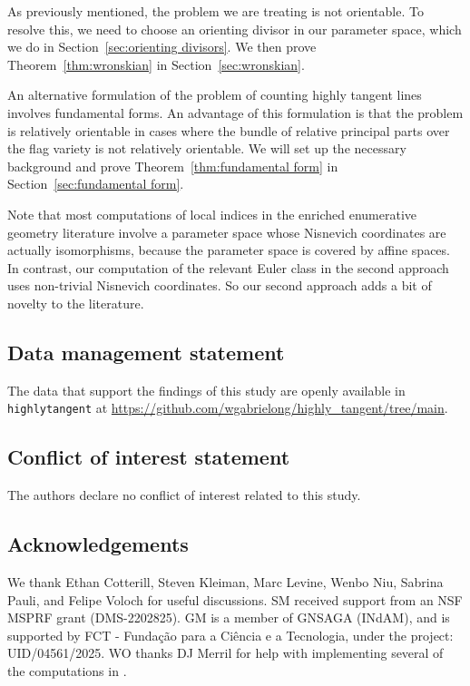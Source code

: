 \documentclass[12pt]{amsart}
\numberwithin{equation}{section}
\theoremstyle{plain}
\theoremstyle{definition}
\begin{document}
As previously mentioned, the problem we are treating is not orientable. To resolve this, we need to choose an orienting divisor in our parameter space, which we do in Section~\ref{sec:orienting divisors}. We then prove Theorem~\ref{thm:wronskian} in Section~\ref{sec:wronskian}.

An alternative formulation of the problem of counting highly tangent lines involves fundamental forms. An advantage of this formulation is that the problem is relatively orientable in cases where the bundle of relative principal parts over the flag variety is not relatively orientable. We will set up the necessary background and prove Theorem~\ref{thm:fundamental form} in Section~\ref{sec:fundamental form}.

Note that most computations of local indices in the enriched enumerative geometry literature involve a parameter space whose Nisnevich coordinates are actually isomorphisms, because the parameter space is covered by affine spaces. In contrast, our computation of the relevant Euler class in the second approach uses non-trivial Nisnevich coordinates. So our second approach adds a bit of novelty to the literature.

\subsection*{Data management statement}
The data that support the findings of this study are openly available in \texttt{highly\textunderscore{}tangent} at \url{https://github.com/wgabrielong/highly_tangent/tree/main}.

\subsection*{Conflict of interest statement}
The authors declare no conflict of interest related to this study.

\subsection*{Acknowledgements}
We thank Ethan Cotterill, Steven Kleiman, Marc Levine, Wenbo Niu, Sabrina Pauli, and Felipe Voloch for useful discussions. SM received support from an NSF MSPRF grant (DMS-2202825). GM is a member of GNSAGA (INdAM), and is supported by FCT - Funda\c{c}\~{a}o para a Ci\^{e}ncia e a Tecnologia, under the project: UID/04561/2025. WO thanks DJ Merril for help with implementing several of the computations in \cite{GabRep}.
\end{document}
